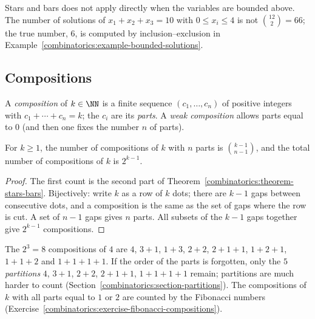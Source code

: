 \begin{counterexample}\label{combinatorics:counterexample-stars-bars-bounded}
Stars and bars does not apply directly when the variables are bounded above. The number of solutions of $x_1 + x_2 + x_3 = 10$ with $0 \leq x_i \leq 4$ is not $\binom{12}{2} = 66$; the true number,
$6$, is computed by inclusion--exclusion in Example~\ref{combinatorics:example-bounded-solutions}.
\end{counterexample}

\subsection{Compositions}\label{combinatorics:subsection-compositions}

\begin{definition}\label{combinatorics:definition-composition}
A \emph{composition} of $k \in \NN$ is a finite sequence $(c_1, \ldots, c_n)$ of positive integers with $c_1 + \cdots + c_n = k$; the $c_i$ are its \emph{parts}. A \emph{weak composition} allows
parts equal to $0$ (and then one fixes the number $n$ of parts).
\end{definition}

\begin{proposition}\label{combinatorics:proposition-compositions}
For $k \geq 1$, the number of compositions of $k$ with $n$ parts is $\binom{k - 1}{n - 1}$, and the total number of compositions of $k$ is $2^{k-1}$.
\end{proposition}

\begin{proof}
The first count is the second part of Theorem~\ref{combinatorics:theorem-stars-bars}. Bijectively: write $k$ as a row of $k$ dots; there are $k - 1$ gaps between consecutive dots, and a composition is
the same as the set of gaps where the row is cut. A set of $n - 1$ gaps gives $n$ parts. All subsets of the $k - 1$ gaps together give $2^{k-1}$ compositions.
\end{proof}

\begin{example}\label{combinatorics:example-compositions}
The $2^3 = 8$ compositions of $4$ are $4$, $3 + 1$, $1 + 3$, $2 + 2$, $2 + 1 + 1$, $1 + 2 + 1$, $1 + 1 + 2$ and $1 + 1 + 1 + 1$. If the order of the parts is forgotten, only the $5$ \emph{partitions}
$4$, $3 + 1$, $2 + 2$, $2 + 1 + 1$, $1 + 1 + 1 + 1$ remain; partitions are much harder to count (Section~\ref{combinatorics:section-partitions}). The compositions of $k$ with all parts equal to $1$ or
$2$ are counted by the Fibonacci numbers (Exercise~\ref{combinatorics:exercise-fibonacci-compositions}).
\end{example}


